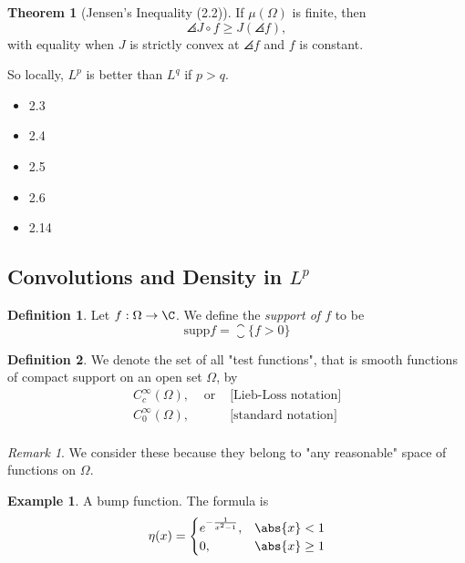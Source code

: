 \documentclass[a5paper]{article}
\theoremstyle{definition}%
\newtheorem{theorem}{Theorem}
\newtheorem*{definition*}{Definition}
\newtheorem*{example*}{Example}
\numberwithin{exercise}{section}
\theoremstyle{remark}%
\newtheorem*{remark*}{Remark}
\begin{document}
\begin{theorem}[Jensen's Inequality (2.2)]If $\mu(\Omega)$ is finite, then 
$$\angles{J\circ f}\geq J(\angles{f}),$$ 
with equality when $J$ is strictly convex at $\angles{f}$ and $f$ is constant. 
\end{theorem}

So locally, $L^p$ is better than $L^q$ if $p>q$. 

\begin{itemize}
\item 2.3
\item 2.4
\item 2.5 
\item 2.6
\item 2.14
\end{itemize}

\subsection{Convolutions and Density in $L^p$}

\newcommand{\supp}{\text{supp}}
\begin{definition*}
Let $f:\Omega\to\C$. We define the \emph{support of $f$} to be 
$$\supp f = \closure{\{f>0\}}$$
\end{definition*}

\begin{definition*}
We denote the set of all "test functions", that is smooth functions of compact support on an open set $\Omega$, by 
\begin{align*}
C^\infty_c(\Omega), &\text{ or } &\text{[Lieb-Loss notation]} \\
C^\infty_0(\Omega), & &\text{[standard notation]} \\
\end{align*}
\end{definition*}

\begin{remark*}
We consider these because they belong to "any reasonable" space of functions on $\Omega$. 
\end{remark*}

\begin{example*}
A bump function. The formula is 
$$\eta(x)=
\begin{cases}
e^{-\frac{1}{x^2-1}}, & \abs{x}<1 \\
0, & \abs{x}\geq1 
\end{cases}
$$
\end{example*}
\end{document}
